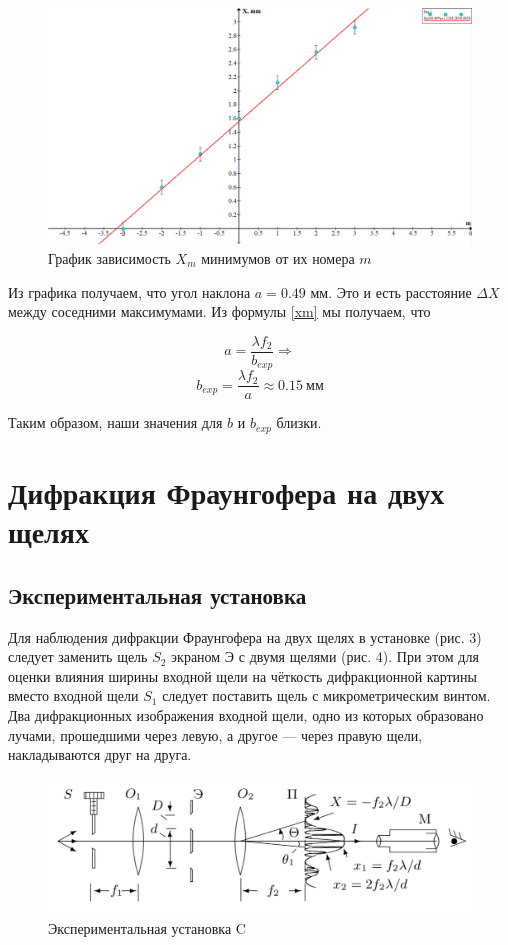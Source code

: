 \documentclass[15pt,a5paper,reqno]{article}
\begin{document}
	\begin{figure}[h!]
	\label{graf_b}
	\includegraphics[scale=0.47]{pics/graph2.png}
	\caption{График зависимость $ X_m $ минимумов от их номера $ m $}
\end{figure}


Из графика получаем, что угол наклона $ a = 0.49 $ мм. Это и есть расстояние $ \Delta X $ между соседними максимумами. Из формулы \eqref{xm} мы получаем, что 

\[ a = \frac{\lambda f_2}{b_{exp}} \Rightarrow   \]
\[ b_{exp} = \frac{\lambda f_2}{a} \approx  0.15 \: \text{мм}    \]

Таким образом, наши значения для $ b $ и $ b_{exp} $ близки. 

\newpage

\section{Дифракция Фраунгофера на двух щелях}

\subsection{Экспериментальная установка}

Для наблюдения дифракции Фраунгофера на двух щелях в установке (рис. 3) следует заменить щель $ S_2 $ экраном Э с двумя щелями
(рис. 4). При этом для оценки влияния ширины входной щели на чёткость дифракционной картины вместо входной щели $ S_1 $ следует поставить щель с микрометрическим винтом. Два дифракционных изображения входной щели, одно из которых образовано лучами, прошедшими через левую, а другое --- через правую щели, накладываются друг на друга.

	\begin{figure}[h!]
		\centering
		\includegraphics[width=0.8\linewidth]{pics/c.png}
		\caption{Экспериментальная установка C}
		\label{labC}
	\end{figure}
\end{document}
